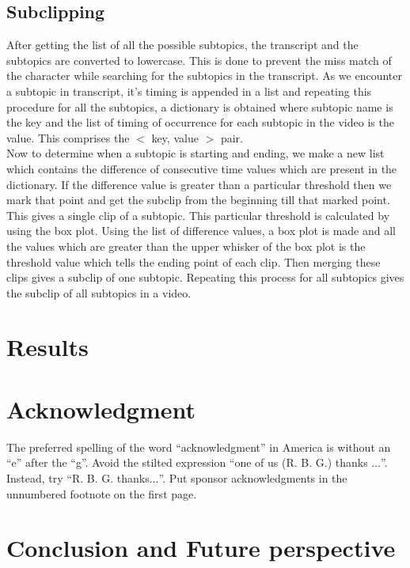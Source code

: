 \documentclass[conference]{IEEEtran}
\begin{document}
\subsection{Subclipping}
After getting the list of all the possible subtopics, the transcript and the subtopics are converted to lowercase. This is done to prevent the miss match of the character while searching for the subtopics in the transcript. As we encounter a subtopic in transcript, it’s timing is appended in a list and repeating this procedure for all the subtopics, a dictionary is obtained where subtopic name is the key and the list of timing of occurrence for each subtopic in the video is the value. This comprises the $<$ key, value $>$ pair.\\
\indent Now to determine when a subtopic is starting and ending, we make a new list which contains the difference of consecutive time values which are present in the dictionary. If the difference value is greater than a particular threshold then we mark that point and get the subclip from the beginning till that marked point. This gives a single clip of a subtopic. This particular threshold is calculated by using the box plot. Using the list of difference values, a box plot is made and all the values which are greater than the upper whisker of the box plot is the threshold value which tells the ending point of each clip. Then merging these clips gives a subclip of one subtopic. Repeating this process for all subtopics gives the subclip of all subtopics in a video.


\section{Results}


\section*{Acknowledgment}

The preferred spelling of the word ``acknowledgment'' in America is without
an ``e'' after the ``g''. Avoid the stilted expression ``one of us (R. B.
G.) thanks $\ldots$''. Instead, try ``R. B. G. thanks$\ldots$''. Put sponsor
acknowledgments in the unnumbered footnote on the first page.

\section{Conclusion and Future perspective}
\end{document}
